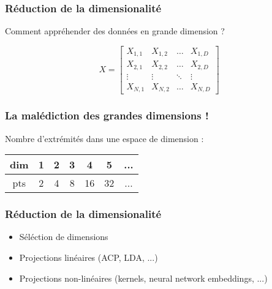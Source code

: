 \begin{frame}
  \frametitle{Réduction de la dimensionalité}
    \begin{center}
      Comment appréhender des données en grande dimension ?
    \end{center}
    \[
    X = \begin{bmatrix}
      X_{1,1} & X_{1,2} & \dots  & X_{1,D} \\
      X_{2,1} & X_{2,2} & \dots  & X_{2,D} \\
      \vdots & \vdots & \ddots & \vdots \\
      X_{N,1} & X_{N,2} & \dots  & X_{N,D}
    \end{bmatrix}
    \]
\end{frame}

\begin{frame}
  \frametitle{La malédiction des grandes dimensions !}
    \begin{center}
      Nombre d'extrémités dans une espace de dimension : \\
      $\;$ \\
      \begin{tabular}{|c|c|c|c|c|c|c|}
        \hline
        dim & 1 & 2 & 3 & 4 & 5 & ... \\
        \hline
        pts & 2 & 4 & 8 & 16 & 32 & ...\\
        \hline
      \end{tabular}
    \end{center}
\end{frame}

\begin{frame}
  \frametitle{Réduction de la dimensionalité}
    \begin{itemize}
    \item Séléction de dimensions
    \item Projections linéaires (ACP, LDA, ...)
    \item Projections non-linéaires (kernels, neural network embeddings, ...)
    \end{itemize}
\end{frame}
